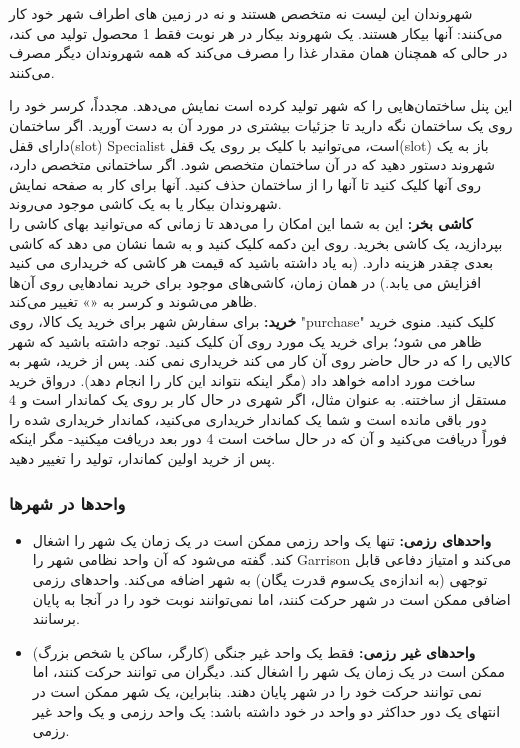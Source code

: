 \documentclass[]{article}
\begin{document}
شهروندان این لیست نه متخصص هستند و نه در زمین های اطراف شهر خود کار می‌کنند: آنها بیکار هستند. یک شهروند بیکار در هر نوبت فقط 1 محصول تولید می کند، در حالی که همچنان همان مقدار غذا را مصرف می‌کند که همه شهروندان دیگر مصرف می‌کنند.

این پنل ساختمان‌هایی را که شهر تولید کرده است نمایش می‌دهد. مجدداً، کرسر خود را روی یک ساختمان نگه دارید تا جزئیات بیشتری در مورد آن به دست آورید. اگر ساختمان دارای قفل(slot) Specialist است، می‌توانید با کلیک بر روی یک قفل(slot)  باز به یک شهروند دستور دهید که در آن ساختمان متخصص شود. اگر ساختمانی متخصص دارد، روی آنها کلیک کنید تا آنها را از ساختمان حذف کنید. آنها برای کار به صفحه نمایش شهروندان بیکار یا به یک کاشی موجود می‌روند.
\\\noindent \textbf{کاشی بخر:}
این به شما این امکان را می‌دهد تا زمانی که می‌توانید بهای کاشی را بپردازید، یک کاشی بخرید. روی این دکمه کلیک کنید و به شما نشان می دهد که کاشی بعدی چقدر هزینه دارد. (به یاد داشته باشید که قیمت هر کاشی که خریداری می کنید افزایش می یابد.) در همان زمان، کاشی‌های موجود برای خرید نمادهایی روی آن‌ها ظاهر می‌شوند و کرسر به «» تغییر می‌کند.
\\\noindent \textbf{خرید:}
برای سفارش شهر برای خرید یک کالا، روی "purchase" کلیک کنید. منوی خرید ظاهر می شود؛ برای خرید یک مورد روی آن کلیک کنید. توجه داشته باشید که شهر کالایی را که در حال حاضر روی آن کار می کند خریداری نمی کند. پس از خرید، شهر به ساخت مورد ادامه خواهد داد (مگر اینکه نتواند این کار را انجام دهد).  درواق خرید مستقل از ساختنه. به عنوان مثال، اگر شهری در حال کار بر روی یک کماندار است و 4 دور باقی مانده است و شما یک کماندار خریداری می‌کنید، کماندار خریداری شده را فوراً دریافت می‌کنید و آن که در حال ساخت است 4 دور بعد دریافت میکنید- مگر اینکه پس از خرید اولین کماندار، تولید را تغییر دهید.

\subsubsection*{{\titr واحدها در شهرها}}
\begin{itemize}
	\item \textbf{واحدهای رزمی:} تنها یک واحد رزمی ممکن است در یک زمان یک شهر را اشغال کند. گفته می‌شود که آن واحد نظامی شهر را Garrison می‌کند و امتیاز دفاعی قابل توجهی (به اندازه‌ی یک‌سوم قدرت یگان) به شهر اضافه می‌کند. واحدهای رزمی اضافی ممکن است در شهر حرکت کنند، اما نمی‌توانند نوبت خود را در آنجا به پایان برسانند.
	\item \textbf{واحدهای غیر رزمی:} فقط یک واحد غیر جنگی (کارگر، ساکن یا شخص بزرگ) ممکن است در یک زمان یک شهر را اشغال کند. دیگران می توانند حرکت کنند، اما نمی توانند حرکت خود را در شهر پایان دهند. بنابراین، یک شهر ممکن است در انتهای یک دور حداکثر دو واحد در خود داشته باشد: یک واحد رزمی و یک واحد غیر رزمی.
\end{itemize}
\end{document}
